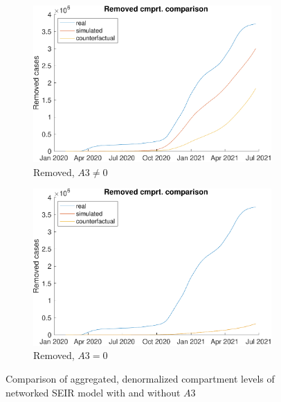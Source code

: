 \begin{figure}[hbtp]
\begin{subfigure}[b]{.45\linewidth}
         \includegraphics[width=\linewidth]{img/210907_171119_combined_wave0/figures/COMP_rem}
         \caption{Removed, $A3 \neq 0$}
         \label{fig:compAggrCombWave0Rem}
     \end{subfigure}
     \hfill
     \begin{subfigure}[b]{.45\linewidth}
         \centering
         \includegraphics[width=\linewidth]{img/210907_180927_combined_wave0_noa3/figures/COMP_rem}
         \caption{Removed, $A3 = 0$}
         \label{fig:compAggrCombWave0NoA3Rem}
     \end{subfigure}     
     \caption[Comparison of aggregated, denormalized compartment levels of networked SEIR model with and without $A3$]{Comparison of aggregated, denormalized compartment levels of networked SEIR model with and without $A3$\protect\footnotemark}
     \label{fig:compAggrCombWave0}
\end{figure}

